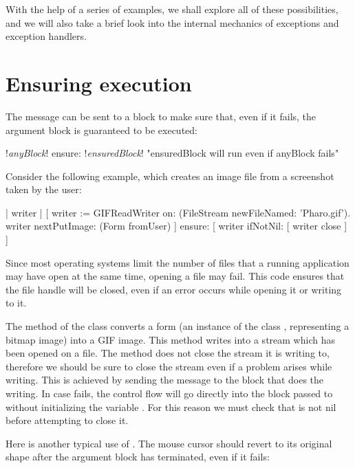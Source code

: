 \documentclass[a4paper,10pt,twoside]{book}
\begin{document}
With the help of a series of examples, we shall explore all of these possibilities, and we will also take a brief look into the internal mechanics of exceptions and exception handlers.

\section{Ensuring execution}

The  message can be sent to a block to make sure that, even if it fails, the argument block is guaranteed to be executed:
\begin{code}{}
!\emph{anyBlock}! ensure: !\emph{ensuredBlock}!    "ensuredBlock will run even if anyBlock fails"
\end{code}

Consider the following example, which creates an image file from a screenshot taken by the user:

\begin{code}{}
| writer |
[	writer := GIFReadWriter on: (FileStream newFileNamed: 'Pharo.gif').
	writer nextPutImage: (Form fromUser)
]	ensure: [ writer ifNotNil: [ writer close ] ]
\end{code}

Since most operating systems limit the number of files that a running application may have open at the same time, opening a file may fail.
This code ensures that the  file handle will be closed, even if an error occurs while opening it or writing to it.

The  method of the class  converts a form (\ie an instance of the class , representing a bitmap image) into a GIF image. This method writes into a stream which has been opened on a file. The  method does not close the stream it is writing to, therefore we should be sure to close the stream even if a problem arises while writing. This is achieved by sending the message  to the block that does the writing. In case  fails, the control flow will go directly into the block passed to  without initializing the variable . For this reason we must check that  is not nil before attempting to close it.

Here is another typical use of .
The mouse cursor should revert to its original shape after the argument block has terminated, even if it fails:
\end{document}
